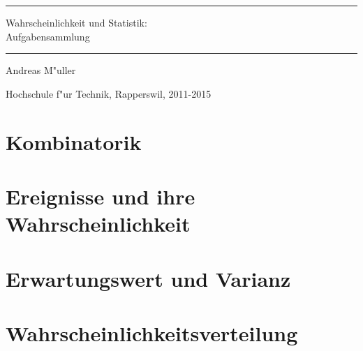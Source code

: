 \documentclass[a4paper,12pt]{book}
\begin{document}
\pagestyle{fancy}
\rhead{}
\frontmatter
\newcommand\HRule{\noindent\rule{\linewidth}{1.5pt}}
\begin{titlepage}
\HRule
\vspace*{2pt}
\begin{flushright}
{\Huge
Wahrscheinlichkeit und Statistik:\\
\bigskip
Aufgabensammlung}
\end{flushright}
\HRule
\begin{flushright}
\vspace{30pt}
\LARGE
Andreas M"uller
\end{flushright}
\begin{center}
Hochschule f"ur Technik, Rapperswil, 2011-2015
\end{center}
\end{titlepage}
\hypersetup{
        linktoc=all,
        linkcolor=blue
}
\tableofcontents
\newenvironment{beispiel}[1][Beispiel]{%
\begin{proof}[#1]%
\renewcommand{\qedsymbol}{$\bigcirc$}
}{\end{proof}}
\mainmatter


\chapter{Kombinatorik}

\chapter{Ereignisse und ihre Wahrscheinlichkeit}

%
\chapter{Erwartungswert und Varianz}

\chapter{Wahrscheinlichkeitsverteilung}

\end{document}
